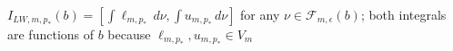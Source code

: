 \(I_{LW,m,p_*}(b)=[\int\ell_{m,p_*}\,d\nu,\int u_{m,p_*}\,d\nu]\) for any \(\nu\in\mathcal F_{m,\epsilon}(b)\); both integrals are functions of \(b\) because \(\ell_{m,p_*},u_{m,p_*}\in V_m\)